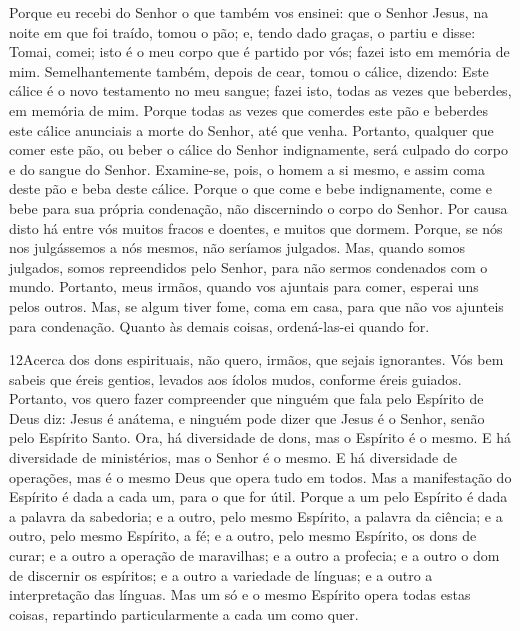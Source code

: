 Porque eu recebi do Senhor o que também vos ensinei: que o Senhor
Jesus, na noite em que foi traído, tomou o pão; e, tendo dado
graças, o partiu e disse: Tomai, comei; isto é o meu corpo que é
partido por vós; fazei isto em memória de mim.
Semelhantemente também, depois de cear, tomou o cálice,
dizendo: Este cálice é o novo testamento no meu sangue; fazei isto,
todas as vezes que beberdes, em memória de mim. Porque todas
as vezes que comerdes este pão e beberdes este cálice anunciais a
morte do Senhor, até que venha. Portanto, qualquer que comer
este pão, ou beber o cálice do Senhor indignamente, será culpado do
corpo e do sangue do Senhor. Examine-se, pois, o homem a si
mesmo, e assim coma deste pão e beba deste cálice. Porque o
que come e bebe indignamente, come e bebe para sua própria
condenação, não discernindo o corpo do Senhor. Por causa
disto há entre vós muitos fracos e doentes, e muitos que dormem.
Porque, se nós nos julgássemos a nós mesmos, não seríamos
julgados. Mas, quando somos julgados, somos repreendidos pelo
Senhor, para não sermos condenados com o mundo. Portanto,
meus irmãos, quando vos ajuntais para comer, esperai uns pelos
outros. Mas, se algum tiver fome, coma em casa, para que não
vos ajunteis para condenação. Quanto às demais coisas, ordená-las-ei
quando for.

\medskip

\lettrine{12} Acerca dos dons espirituais, não quero, irmãos,
que sejais ignorantes. Vós bem sabeis que éreis gentios, levados
aos ídolos mudos, conforme éreis guiados. Portanto, vos quero
fazer compreender que ninguém que fala pelo Espírito de Deus diz:
Jesus é anátema, e ninguém pode dizer que Jesus é o Senhor, senão
pelo Espírito Santo. Ora, há diversidade de dons, mas o Espírito
é o mesmo. E há diversidade de ministérios, mas o Senhor é o
mesmo. E há diversidade de operações, mas é o mesmo Deus que
opera tudo em todos. Mas a manifestação do Espírito é dada a
cada um, para o que for útil. Porque a um pelo Espírito é dada a
palavra da sabedoria; e a outro, pelo mesmo Espírito, a palavra da
ciência; e a outro, pelo mesmo Espírito, a fé; e a outro, pelo
mesmo Espírito, os dons de curar; e a outro a operação de
maravilhas; e a outro a profecia; e a outro o dom de discernir os
espíritos; e a outro a variedade de línguas; e a outro a
interpretação das línguas. Mas um só e o mesmo Espírito opera
todas estas coisas, repartindo particularmente a cada um como quer.

